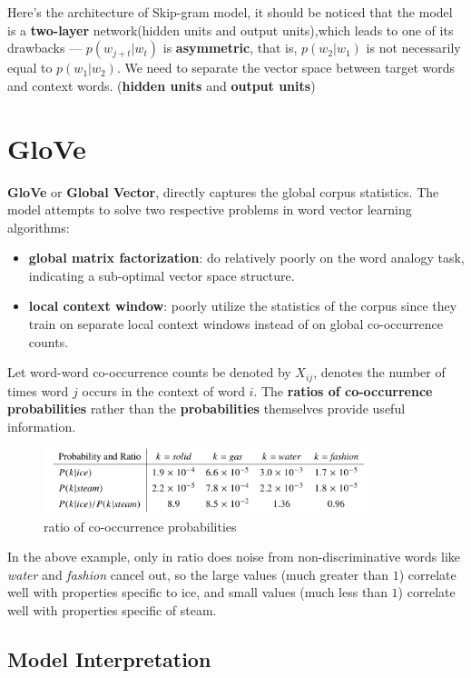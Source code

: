 \documentclass[a4paper, 12pt]{book} %
\begin{document}
Here's the architecture of Skip-gram model, it should be noticed that the model is a \textbf{two-layer} network(hidden units and output units),which leads to one of its drawbacks --- $p(w_{j+t}|w_t)$ is \textbf{asymmetric}, that is, $p(w_2|w_1)$ is not necessarily equal to $p(w_1|w_2)$. We need to separate the vector space between target words and context words. (\textbf{hidden units} and \textbf{output units})


\section{GloVe}
\textbf{GloVe} or \textbf{Global Vector}, directly captures the global corpus statistics. The model attempts to solve two respective problems in word vector learning algorithms:

\begin{itemize}
	\item \textbf{global matrix factorization}: do relatively poorly on the word analogy task, indicating a sub-optimal vector space structure. 
	\item \textbf{local context window}: poorly utilize the statistics of the corpus since they train on separate local context windows instead of on global co-occurrence counts.
\end{itemize}

Let word-word co-occurrence counts be denoted by $X_{ij}$, denotes the number of times word $j$ occurs in the context of word $i$. The \textbf{ratios of co-occurrence probabilities} rather than the \textbf{probabilities} themselves provide useful information.

\begin{figure}[htpb]
	\centering
	\includegraphics[width=9.5cm]{figures/glove_co-occurrence_ratio.png}
	\caption{ratio of co-occurrence probabilities}
	\label{fig:boat1}
\end{figure}

In the above example, only in ratio does noise from non-discriminative  words like \emph{water} and \emph{fashion} cancel out, so the large values (much greater than $1$) correlate well with properties specific to ice, and small values (much less than $1$) correlate well with properties specific of steam.

\subsection{Model Interpretation}
\end{document}
